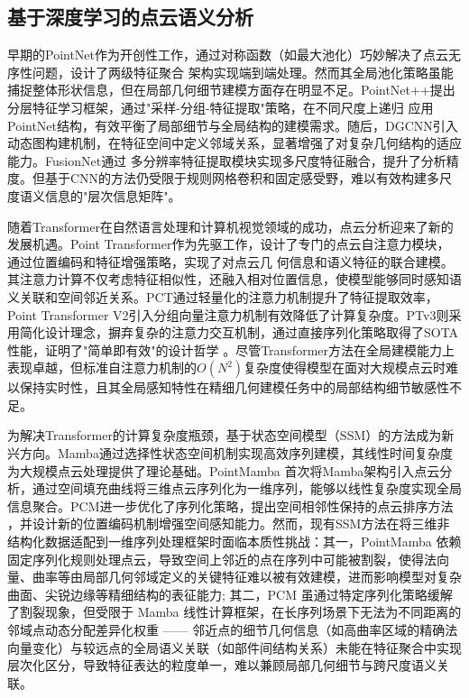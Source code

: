 \documentclass[preprint,12pt]{elsarticle}
\begin{document}
\subsection{基于深度学习的点云语义分析}
早期的PointNet\cite{pointnet}作为开创性工作，通过对称函数（如最大池化）巧妙解决了点云无序性问题，设计了两级特征聚合
架构实现端到端处理。然而其全局池化策略虽能捕捉整体形状信息，但在局部几何细节建模方面存在明显不足。PointNet++\cite{PointNet++}提出分层特征学习框架，通过"采样-分组-特征提取"策略，在不同尺度上递归
应用PointNet结构，有效平衡了局部细节与全局结构的建模需求。随后，DGCNN\cite{DGCNN}引入动态图构建机制，在特征空间中定义邻域关系，显著增强了对复杂几何结构的适应能力。FusionNet\cite{FusionNet}通过
多分辨率特征提取模块实现多尺度特征融合，提升了分析精度。但基于CNN的方法仍受限于规则网格卷积和固定感受野，难以有效构建多尺度语义信息的"层次信息矩阵"。

随着Transformer在自然语言处理和计算机视觉领域的成功，点云分析迎来了新的发展机遇。Point Transformer\cite{pt}作为先驱工作，设计了专门的点云自注意力模块，通过位置编码和特征增强策略，实现了对点云几
何信息和语义特征的联合建模。其注意力计算不仅考虑特征相似性，还融入相对位置信息，使模型能够同时感知语义关联和空间邻近关系。PCT\cite{PCT}通过轻量化的注意力机制提升了特征提取效率，Point
Transformer V2\cite{ptv2}引入分组向量注意力机制有效降低了计算复杂度。PTv3\cite{ptv3}则采用简化设计理念，摒弃复杂的注意力交互机制，通过直接序列化策略取得了SOTA性能，证明了"简单即有效"的设计哲学      
。尽管Transformer方法在全局建模能力上表现卓越，但标准自注意力机制的$O(N^2)$复杂度使得模型在面对大规模点云时难以保持实时性，且其全局感知特性在精细几何建模任务中的局部结构细节敏感性不足。

为解决Transformer的计算复杂度瓶颈，基于状态空间模型（SSM）的方法成为新兴方向。Mamba\cite{Mamba}通过选择性状态空间机制实现高效序列建模，其线性时间复杂度为大规模点云处理提供了理论基础。PointMamba     
\cite{PointMamba}首次将Mamba架构引入点云分析，通过空间填充曲线将三维点云序列化为一维序列，能够以线性复杂度实现全局信息聚合。PCM\cite{pcm}进一步优化了序列化策略，提出空间相邻性保持的点云排序方法     
，并设计新的位置编码机制增强空间感知能力。然而，现有SSM方法在将三维非结构化数据适配到一维序列处理框架时面临本质性挑战：其一，PointMamba 依赖固定序列化规则处理点云，导致空间上邻近的点在序列中可能被割裂，使得法向量、曲率等由局部几何邻域定义的关键特征难以被有效建模，进而影响模型对复杂曲面、尖锐边缘等精细结构的表征能力;
其二，PCM 虽通过特定序列化策略缓解了割裂现象，但受限于 Mamba 线性计算框架，在长序列场景下无法为不同距离的邻域点动态分配差异化权重 —— 邻近点的细节几何信息（如高曲率区域的精确法向量变化）与较远点的全局语义关联（如部件间结构关系）未能在特征聚合中实现层次化区分，导致特征表达的粒度单一，难以兼顾局部几何细节与跨尺度语义关联。
\end{document}
